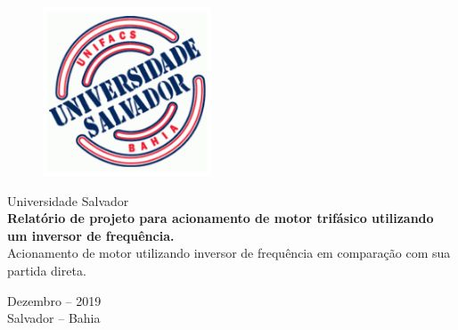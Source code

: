 \documentclass[a4paper, 12pt,oneside, english, brazil]{abntex2}
\begin{document}
\setlength{\parindent}{1.3cm}
\frenchspacing

\begin{capa}
    

	\begin{center}
	
	\begin{figure}[H]
	\centering
	\includegraphics[width=5cm]{facs.png}
	\end{figure}

		\Huge{Universidade Salvador}\\
		\vspace{15pt}
        \vspace{80pt}
        \textbf{\LARGE{Relatório de projeto para acionamento de motor trifásico utilizando um inversor de frequência.}}\\
        \vspace{2pt}
        \large{Acionamento de motor utilizando inversor de frequência em comparação com sua partida direta.}
		\vspace{3,0cm}
	\end{center}

	\begin{center}
	  	\large{Dezembro -- 2019}\\
	\large{Salvador -- Bahia}  
	\end{center}
\end{capa}
\end{document}
